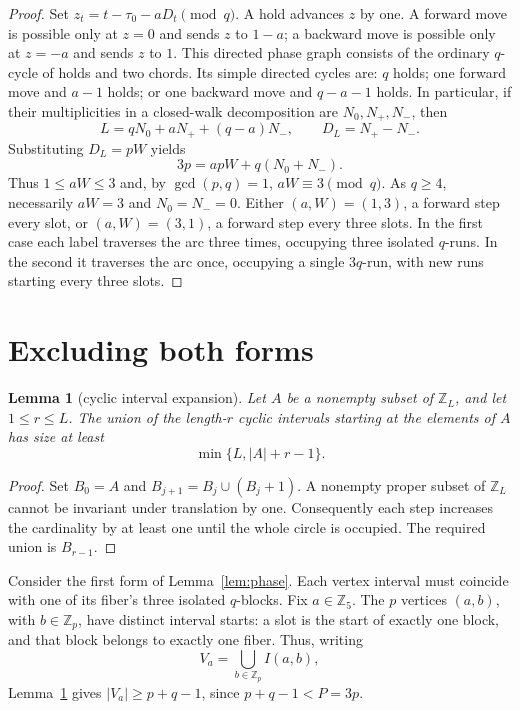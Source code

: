 \documentclass[11pt]{article}
\newtheorem{lemma}[theorem]{Lemma}
\newcommand{\Z}{\mathbb Z}
\begin{document}
\begin{proof}
Set $z_t=t-\tau_0-aD_t\pmod q$.  A hold advances $z$ by one.
A forward move is possible only at $z=0$ and sends $z$ to $1-a$;
a backward move is possible only at $z=-a$ and sends $z$ to $1$.
This directed phase graph consists of the ordinary $q$-cycle of holds
and two chords.  Its simple directed cycles are: $q$ holds; one forward
move and $a-1$ holds; or one backward move and $q-a-1$ holds.
In particular, if their multiplicities in a closed-walk decomposition
are $N_0,N_+,N_-$, then
\[
 L=qN_0+aN_++(q-a)N_-,\qquad D_L=N_+-N_-.
\]
Substituting $D_L=pW$ yields
\begin{equation}\label{eq:phase-arithmetic}
 3p=apW+q(N_0+N_-).
\end{equation}
Thus $1\leq aW\leq3$ and, by $\gcd(p,q)=1$,
$aW\equiv3\pmod q$.  As $q\geq4$, necessarily $aW=3$ and
$N_0=N_-=0$.  Either $(a,W)=(1,3)$, a forward step every slot, or
$(a,W)=(3,1)$, a forward step every three slots.  In the first case
each label traverses the arc three times, occupying three isolated
$q$-runs.  In the second it traverses the arc once, occupying a
single $3q$-run, with new runs starting every three slots.
\end{proof}

\section{Excluding both forms}
\begin{lemma}[cyclic interval expansion]\label{lem:expansion}
Let $A$ be a nonempty subset of $\Z_L$, and let $1\leq r\leq L$.
The union of the length-$r$ cyclic intervals starting at the elements
of $A$ has size at least
\[
  \min\{L,|A|+r-1\}.
\]
\end{lemma}
\begin{proof}
Set $B_0=A$ and $B_{j+1}=B_j\cup(B_j+1)$. A nonempty proper
subset of $\Z_L$ cannot be invariant under translation by one.
Consequently each step increases the cardinality by at least one
until the whole circle is occupied. The required union is $B_{r-1}$.
\end{proof}

Consider the first form of Lemma~\ref{lem:phase}. Each vertex
interval must coincide with one of its fiber's three isolated
$q$-blocks. Fix $a\in\Z_5$. The $p$ vertices $(a,b)$, with
$b\in\Z_p$, have distinct interval starts: a slot is the start of
exactly one block, and that block belongs to exactly one fiber.
Thus, writing
\[
  V_a=\bigcup_{b\in\Z_p} I(a,b),
\]
Lemma~\ref{lem:expansion} gives $|V_a|\geq p+q-1$, since
$p+q-1<P=3p$.
\end{document}
